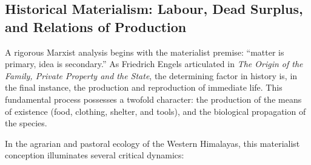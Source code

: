 \documentclass[11pt,a4paper]{article}
\begin{document}
\subsection{Historical Materialism: Labour, Dead Surplus, and Relations of Production}
A rigorous Marxist analysis begins with the materialist premise: ``matter is primary, idea is secondary.'' As Friedrich Engels articulated in \textit{The Origin of the Family, Private Property and the State}, the determining factor in history is, in the final instance, the production and reproduction of immediate life. This fundamental process possesses a twofold character: the production of the means of existence (food, clothing, shelter, and tools), and the biological propagation of the species.

In the agrarian and pastoral ecology of the Western Himalayas, this materialist conception illuminates several critical dynamics:
\end{document}
